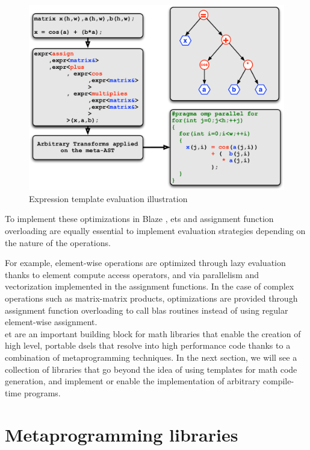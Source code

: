 \documentclass[../main]{subfiles}
\begin{document}
\begin{figure}[h]
\includegraphics[width=\textwidth]{images/expressiontemplates.pdf}
\caption{
  Expression template evaluation illustration\cite{falcou-hdr}
}
\label{fig:expression-template-illustration}
\end{figure}

To implement these optimizations in Blaze \cite{blazelib},
\glspl{et} and assignment function overloading are equally essential
to implement evaluation strategies depending on the nature of the operations.

For example, element-wise operations are optimized through lazy evaluation
thanks to element compute access operators, and via parallelism
and vectorization implemented in the assignment functions.
In the case of complex operations such as matrix-matrix products,
optimizations are provided through assignment function overloading
to call \gls{blas} routines instead of using regular element-wise assignment.
\\

\acrlong{et} are an important building block for \cpp math libraries that
enable the creation of high level, portable \glspl{dsel} that resolve into
high performance code thanks to a combination of metaprogramming techniques.
In the next section, we will see a collection of libraries that go beyond the
idea of using templates for math code generation, and implement or enable the
implementation of arbitrary compile-time programs.

\section{
  Metaprogramming libraries
}
\label{lbl:meta-libraries}
\end{document}

